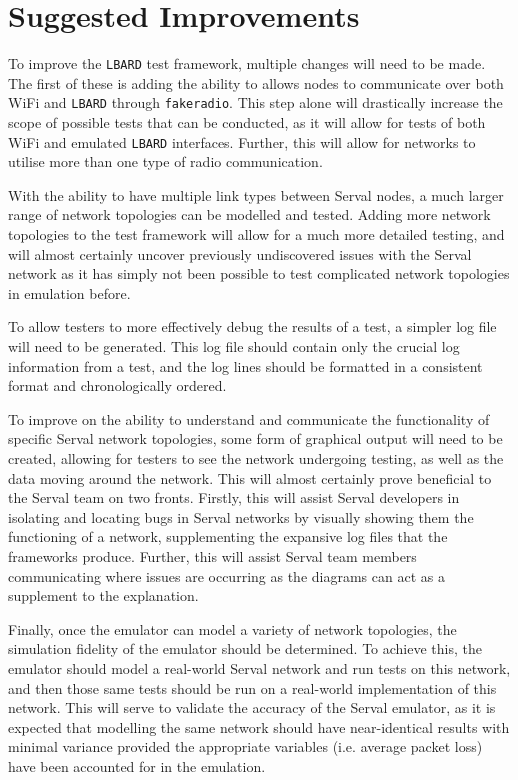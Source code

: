 \section{Suggested Improvements}
To improve the \texttt{LBARD} test framework, multiple changes will need to be made.
The first of these is adding the ability to allows nodes to communicate over both WiFi and \texttt{LBARD} through \texttt{fakeradio}.
This step alone will drastically increase the scope of possible tests that can be conducted, as it will allow for tests of both WiFi and emulated \texttt{LBARD} interfaces.
Further, this will allow for networks to utilise more than one type of radio communication.

With the ability to have multiple link types between Serval nodes, a much larger range of network topologies can be modelled and tested.
Adding more network topologies to the test framework will allow for a much more detailed testing, and will almost certainly uncover previously undiscovered issues with the Serval network as it has simply not been possible to test complicated network topologies in emulation before.

To allow testers to more effectively debug the results of a test, a simpler log file will need to be generated.
This log file should contain only the crucial log information from a test, and the log lines should be formatted in a consistent format and chronologically ordered.

To improve on the ability to understand and communicate the functionality of specific Serval network topologies, some form of graphical output will need to be created, allowing for testers to see the network undergoing testing, as well as the data moving around the network.
This will almost certainly prove beneficial to the Serval team on two fronts. 
Firstly, this will assist Serval developers in isolating and locating bugs in Serval networks by visually showing them the functioning of a network, supplementing the expansive log files that the frameworks produce.
Further, this will assist Serval team members communicating where issues are occurring as the diagrams can act as a supplement to the explanation.

Finally, once the emulator can model a variety of network topologies, the simulation fidelity of the emulator should be determined.
To achieve this, the emulator should model a real-world Serval network and run tests on this network, and then those same tests should be run on a real-world implementation of this network.
This will serve to validate the accuracy of the Serval emulator, as it is expected that modelling the same network should have near-identical results with minimal variance provided the appropriate variables (i.e. average packet loss) have been accounted for in the emulation.

